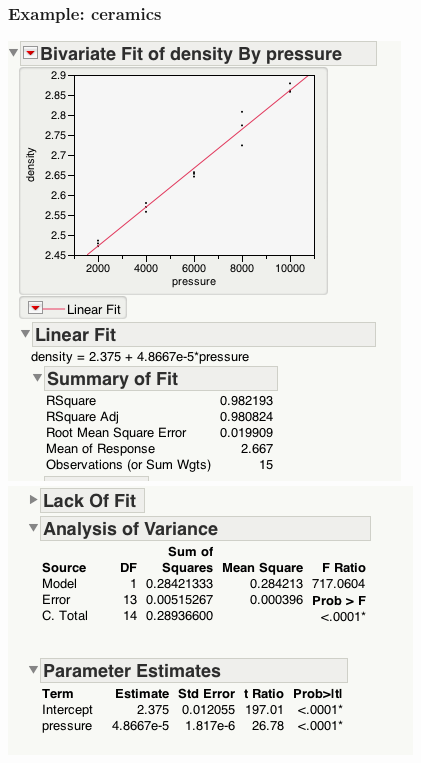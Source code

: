 \documentclass[handout]{beamer}\usepackage{graphicx, color}
\numberwithin{equation}{section}
\begin{document}
\begin{frame}
\frametitle{Example: ceramics}
\begin{center}
 \includegraphics{../../fig/jmpcer1.png}
 \includegraphics{../../fig/jmpcer2.png}
\end{center}
\end{frame}
\end{document}
